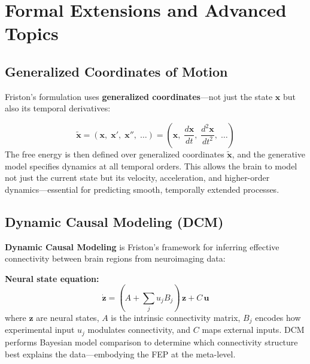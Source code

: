 \documentclass[11pt,a4paper]{report}
\begin{document}
\chapter{Formal Extensions and Advanced Topics}

\section{Generalized Coordinates of Motion}

Friston's formulation uses \textbf{generalized coordinates}---not just the state $\mathbf{x}$ but also its temporal derivatives:

\begin{mathbox}
\vspace{-8pt}
\[
  \tilde{\mathbf{x}} = \left(\mathbf{x},\; \mathbf{x}',\; \mathbf{x}'',\; \ldots\right) = \left(\mathbf{x},\; \frac{d\mathbf{x}}{dt},\; \frac{d^2\mathbf{x}}{dt^2},\; \ldots\right)
\]
The free energy is then defined over generalized coordinates $\tilde{\mathbf{x}}$, and the generative model specifies dynamics at all temporal orders. This allows the brain to model not just the current state but its velocity, acceleration, and higher-order dynamics---essential for predicting smooth, temporally extended processes.
\vspace{-4pt}
\end{mathbox}

\section{Dynamic Causal Modeling (DCM)}

\textbf{Dynamic Causal Modeling} is Friston's framework for inferring effective connectivity between brain regions from neuroimaging data:

\begin{mathbox}
\vspace{-6pt}
\textbf{Neural state equation:}
\[
  \dot{\mathbf{z}} = (A + \sum_j u_j B_j)\, \mathbf{z} + C\, \mathbf{u}
\]
where $\mathbf{z}$ are neural states, $A$ is the intrinsic connectivity matrix, $B_j$ encodes how experimental input $u_j$ modulates connectivity, and $C$ maps external inputs. DCM performs Bayesian model comparison to determine which connectivity structure best explains the data---embodying the FEP at the meta-level.
\vspace{-4pt}
\end{mathbox}
\end{document}
